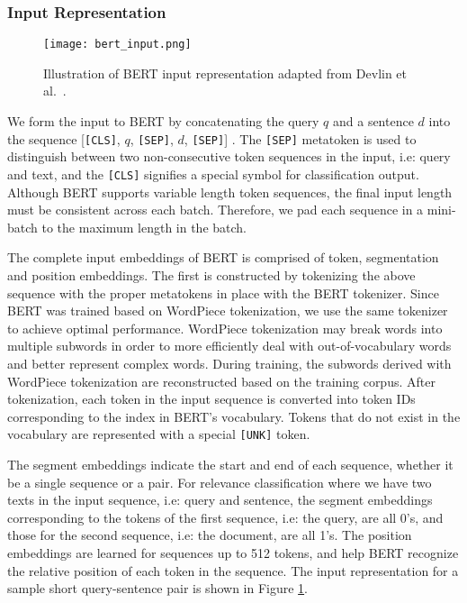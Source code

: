 \subsubsection{Input Representation}


\begin{figure}[b!]
\centering
  \texttt{[image: bert\_input.png]}
\caption{Illustration of BERT input representation adapted from Devlin et al.~\cite{devlin2018bert}.}
\label{fig:bert_input}
\end{figure}

We form the input to BERT by concatenating the query $ q $ and a sentence $ d $ into the sequence [\texttt{[CLS]}, $q$, \texttt{[SEP]}, $d$, \texttt{[SEP]}] .
The \texttt{[SEP]} metatoken is used to distinguish between two non-consecutive token sequences in the input, i.e: query and text, and the \texttt{[CLS]} signifies a special symbol for classification output.
Although BERT supports variable length token sequences, the final input length must be consistent across each batch.
Therefore, we pad each sequence in a mini-batch to the maximum length in the batch.

The complete input embeddings of BERT is comprised of token, segmentation and position embeddings.
The first is constructed by tokenizing the above sequence with the proper metatokens in place with the BERT tokenizer.
Since BERT was trained based on WordPiece tokenization, we use the same tokenizer to achieve optimal performance.
WordPiece tokenization may break words into multiple subwords in order to more efficiently deal with out-of-vocabulary words and better represent complex words.
During training, the subwords derived with WordPiece tokenization are reconstructed based on the training corpus.
After tokenization, each token in the input sequence is converted into token IDs corresponding to the index in BERT's vocabulary.
Tokens that do not exist in the vocabulary are represented with a special \texttt{[UNK]} token.

The segment embeddings indicate the start and end of each sequence, whether it be a single sequence or a pair.
For relevance classification where we have two texts in the input sequence, i.e: query and sentence, the segment embeddings corresponding to the tokens of the first sequence, i.e: the query, are all 0's, and those for the second sequence, i.e: the document, are all 1's.
The position embeddings are learned for sequences up to 512 tokens, and help BERT recognize the relative position of each token in the sequence.
The input representation for a sample short query-sentence pair is shown in Figure \ref{fig:bert_input}.

